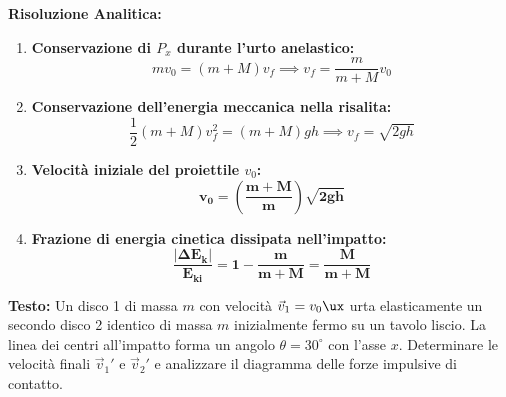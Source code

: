 \textbf{Risoluzione Analitica:}
\begin{enumerate}
    \item \textbf{Conservazione di $P_x$ durante l'urto anelastico:}
    \begin{equation}
        m v_0 = (m + M) v_f \implies v_f = \frac{m}{m + M}v_0
    \end{equation}
    \item \textbf{Conservazione dell'energia meccanica nella risalita:}
    \begin{equation}
        \frac{1}{2}(m + M) v_f^2 = (m + M)gh \implies v_f = \sqrt{2gh}
    \end{equation}
    \item \textbf{Velocità iniziale del proiettile $v_0$:}
    \begin{equation}
        \mathbf{v_0 = \left(\frac{m + M}{m}\right)\sqrt{2gh}}
    \end{equation}
    \item \textbf{Frazione di energia cinetica dissipata nell'impatto:}
    \begin{equation}
        \mathbf{\frac{|\Delta E_k|}{E_{ki}} = 1 - \frac{m}{m+M} = \frac{M}{m + M}}
    \end{equation}
\end{enumerate}

\vspace{0.8em}

\begin{esercizio}
\textbf{Testo:}
Un disco 1 di massa $m$ con velocità $\vec{v}_1 = v_0\ux$ urta elasticamente un secondo disco 2 identico di massa $m$ inizialmente fermo su un tavolo liscio. La linea dei centri all'impatto forma un angolo $\theta = 30^\circ$ con l'asse $x$. Determinare le velocità finali $\vec{v}_1'$ e $\vec{v}_2'$ e analizzare il diagramma delle forze impulsive di contatto.
\end{esercizio}

